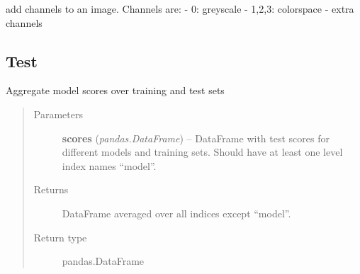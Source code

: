 \documentclass[letterpaper,10pt,english]{sphinxmanual}
\begin{document}
\begin{fulllineitems}
\label{flamingo/classification/index:flamingo.classification.channels.add_channels}
add channels to an image.
Channels are:
- 0: greyscale
- 1,2,3: colorspace
- extra channels

\end{fulllineitems}



\subsection{Test}
\label{flamingo/classification/index:test}\label{flamingo/classification/index:module-flamingo.classification.test}

\begin{fulllineitems}
\label{flamingo/classification/index:flamingo.classification.test.aggregate_scores}
Aggregate model scores over training and test sets
\begin{quote}\begin{description}
\item[{Parameters}] \leavevmode
\textbf{scores} (\emph{pandas.DataFrame}) -- DataFrame with test scores for different models and training sets.
Should have at least one level index names ``model''.

\item[{Returns}] \leavevmode
DataFrame averaged over all indices except ``model''.

\item[{Return type}] \leavevmode
pandas.DataFrame

\end{description}\end{quote}

\end{fulllineitems}

\end{document}
